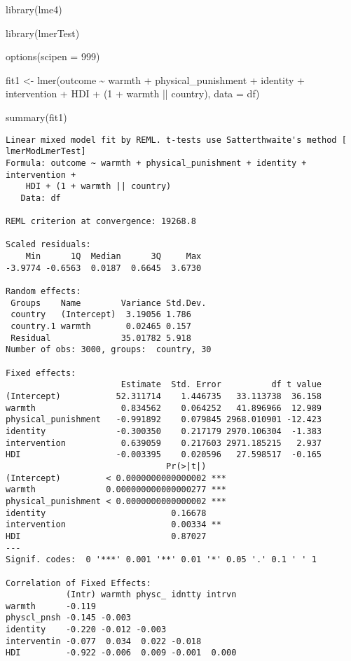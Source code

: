 \documentclass[
  letterpaper,
  DIV=11,
  numbers=noendperiod]{scrreprt}
\newenvironment{Shaded}{\begin{snugshade}}{\end{snugshade}}
\newcommand{\AttributeTok}[1]{\textcolor[rgb]{0.40,0.45,0.13}{#1}}
\newcommand{\DecValTok}[1]{\textcolor[rgb]{0.68,0.00,0.00}{#1}}
\newcommand{\FunctionTok}[1]{\textcolor[rgb]{0.28,0.35,0.67}{#1}}
\newcommand{\NormalTok}[1]{\textcolor[rgb]{0.00,0.23,0.31}{#1}}
\newcommand{\OtherTok}[1]{\textcolor[rgb]{0.00,0.23,0.31}{#1}}
\newcommand{\SpecialCharTok}[1]{\textcolor[rgb]{0.37,0.37,0.37}{#1}}
\begin{document}
\begin{Shaded}
\begin{Highlighting}[]
\FunctionTok{library}\NormalTok{(lme4) }

\FunctionTok{library}\NormalTok{(lmerTest)}

\FunctionTok{options}\NormalTok{(}\AttributeTok{scipen =} \DecValTok{999}\NormalTok{) }

\NormalTok{fit1 }\OtherTok{\textless{}{-}} \FunctionTok{lmer}\NormalTok{(outcome }\SpecialCharTok{\textasciitilde{}}\NormalTok{ warmth }\SpecialCharTok{+}\NormalTok{ physical\_punishment }\SpecialCharTok{+} 
\NormalTok{               identity }\SpecialCharTok{+}\NormalTok{ intervention }\SpecialCharTok{+}\NormalTok{ HDI }\SpecialCharTok{+}
\NormalTok{               (}\DecValTok{1} \SpecialCharTok{+}\NormalTok{ warmth }\SpecialCharTok{||}\NormalTok{ country),}
             \AttributeTok{data =}\NormalTok{ df)}

\FunctionTok{summary}\NormalTok{(fit1)}
\end{Highlighting}
\end{Shaded}

\begin{verbatim}
Linear mixed model fit by REML. t-tests use Satterthwaite's method [
lmerModLmerTest]
Formula: outcome ~ warmth + physical_punishment + identity + intervention +  
    HDI + (1 + warmth || country)
   Data: df

REML criterion at convergence: 19268.8

Scaled residuals: 
    Min      1Q  Median      3Q     Max 
-3.9774 -0.6563  0.0187  0.6645  3.6730 

Random effects:
 Groups    Name        Variance Std.Dev.
 country   (Intercept)  3.19056 1.786   
 country.1 warmth       0.02465 0.157   
 Residual              35.01782 5.918   
Number of obs: 3000, groups:  country, 30

Fixed effects:
                       Estimate  Std. Error          df t value
(Intercept)           52.311714    1.446735   33.113738  36.158
warmth                 0.834562    0.064252   41.896966  12.989
physical_punishment   -0.991892    0.079845 2968.010901 -12.423
identity              -0.300350    0.217179 2970.106304  -1.383
intervention           0.639059    0.217603 2971.185215   2.937
HDI                   -0.003395    0.020596   27.598517  -0.165
                                Pr(>|t|)    
(Intercept)         < 0.0000000000000002 ***
warmth              0.000000000000000277 ***
physical_punishment < 0.0000000000000002 ***
identity                         0.16678    
intervention                     0.00334 ** 
HDI                              0.87027    
---
Signif. codes:  0 '***' 0.001 '**' 0.01 '*' 0.05 '.' 0.1 ' ' 1

Correlation of Fixed Effects:
            (Intr) warmth physc_ idntty intrvn
warmth      -0.119                            
physcl_pnsh -0.145 -0.003                     
identity    -0.220 -0.012 -0.003              
interventin -0.077  0.034  0.022 -0.018       
HDI         -0.922 -0.006  0.009 -0.001  0.000
\end{verbatim}
\end{document}
